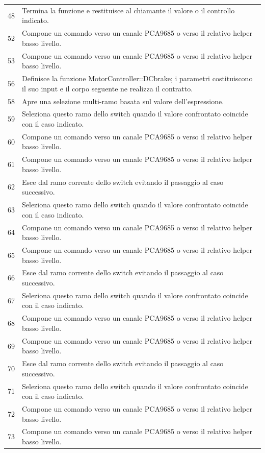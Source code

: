 \documentclass[11pt,a4paper]{article}
\begin{document}
\begin{longtable}{p{}p{}}
48 & Termina la funzione e restituisce al chiamante il valore o il controllo indicato. \\
52 & Compone un comando verso un canale PCA9685 o verso il relativo helper basso livello. \\
53 & Compone un comando verso un canale PCA9685 o verso il relativo helper basso livello. \\
56 & Definisce la funzione MotorController::DCbrake; i parametri costituiscono il suo input e il corpo seguente ne realizza il contratto. \\
58 & Apre una selezione multi-ramo basata sul valore dell'espressione. \\
59 & Seleziona questo ramo dello switch quando il valore confrontato coincide con il caso indicato. \\
60 & Compone un comando verso un canale PCA9685 o verso il relativo helper basso livello. \\
61 & Compone un comando verso un canale PCA9685 o verso il relativo helper basso livello. \\
62 & Esce dal ramo corrente dello switch evitando il passaggio al caso successivo. \\
63 & Seleziona questo ramo dello switch quando il valore confrontato coincide con il caso indicato. \\
64 & Compone un comando verso un canale PCA9685 o verso il relativo helper basso livello. \\
65 & Compone un comando verso un canale PCA9685 o verso il relativo helper basso livello. \\
66 & Esce dal ramo corrente dello switch evitando il passaggio al caso successivo. \\
67 & Seleziona questo ramo dello switch quando il valore confrontato coincide con il caso indicato. \\
68 & Compone un comando verso un canale PCA9685 o verso il relativo helper basso livello. \\
69 & Compone un comando verso un canale PCA9685 o verso il relativo helper basso livello. \\
70 & Esce dal ramo corrente dello switch evitando il passaggio al caso successivo. \\
71 & Seleziona questo ramo dello switch quando il valore confrontato coincide con il caso indicato. \\
72 & Compone un comando verso un canale PCA9685 o verso il relativo helper basso livello. \\
73 & Compone un comando verso un canale PCA9685 o verso il relativo helper basso livello. \\

\end{longtable}
\end{document}
